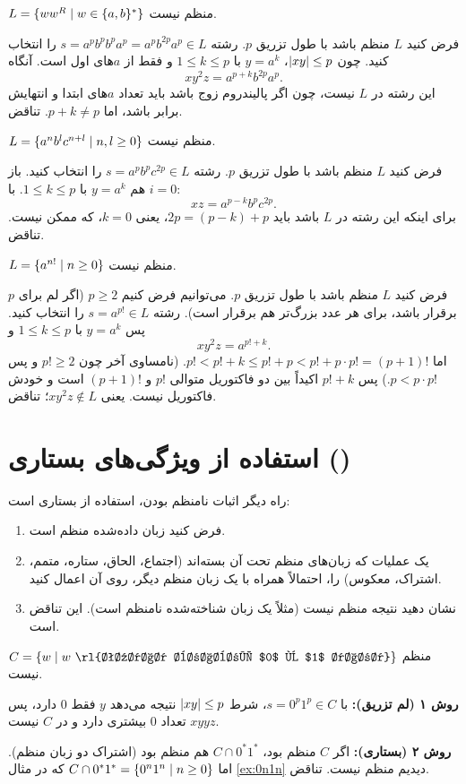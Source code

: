 \begin{example}
$L=\{ww^R\mid w\in\{a,b\}^*\}$ منظم نیست.

فرض کنید $L$ منظم باشد با طول تزریق $p$. رشته $s=a^pb^pb^pa^p=a^pb^{2p}a^p\in L$ را انتخاب کنید. چون $\lvert xy\rvert\le p$، $y=a^k$ با $1\le k\le p$ و فقط از $a$های اول است. آنگاه
\[xy^2z=a^{p+k}b^{2p}a^p.\]
این رشته در $L$ نیست، چون اگر پالیندروم زوج باشد باید تعداد $a$های ابتدا و انتهایش برابر باشد، اما $p+k\neq p$. تناقض.
\end{example}

\begin{example}
$L=\{a^nb^lc^{n+l}\mid n,l\ge0\}$ منظم نیست.

فرض کنید $L$ منظم باشد با طول تزریق $p$. رشته $s=a^pb^pc^{2p}\in L$ را انتخاب کنید. باز هم $y=a^k$ با $1\le k\le p$. با $i=0$:
\[xz=a^{p-k}b^pc^{2p}.\]
برای اینکه این رشته در $L$ باشد باید $2p=(p-k)+p$، یعنی $k=0$، که ممکن نیست. تناقض.
\end{example}

\begin{example}[فاکتوریل]
$L=\{a^{n!}\mid n\ge0\}$ منظم نیست.

فرض کنید $L$ منظم باشد با طول تزریق $p$. می‌توانیم فرض کنیم $p\ge2$ (اگر لم برای $p$ برقرار باشد، برای هر عدد بزرگ‌تر هم برقرار است). رشته $s=a^{p!}\in L$ را انتخاب کنید. پس $y=a^k$ با $1\le k\le p$ و
\[xy^2z=a^{p!+k}.\]
اما $p!<p!+k\le p!+p<p!+p\cdot p!=(p+1)!$. (نامساوی آخر چون $p!\ge2$ و پس $p<p\cdot p!$.) پس $p!+k$ اکیداً بین دو فاکتوریل متوالی $p!$ و $(p+1)!$ است و خودش فاکتوریل نیست. یعنی $xy^2z\notin L$؛ تناقض.
\end{example}

\section{استفاده از ویژگی‌های بستاری ()}

راه دیگر اثبات نامنظم بودن، استفاده از بستاری است:
\begin{enumerate}
\item فرض کنید زبان داده‌شده منظم است.
\item یک عملیات که زبان‌های منظم تحت آن بسته‌اند (اجتماع، الحاق، ستاره، متمم، اشتراک، معکوس) را، احتمالاً همراه با یک زبان منظم دیگر، روی آن اعمال کنید.
\item نشان دهید نتیجه منظم نیست (مثلاً یک زبان شناخته‌شده نامنظم است). این تناقض است.
\end{enumerate}

\begin{example}
$C=\{w\st w\ \text{\rl{تعداد برابری $0$ و $1$ دارد}}\}$ منظم نیست.

\textbf{روش ۱ (لم تزریق):} با $s=0^p1^p\in C$، شرط $\lvert xy\rvert\le p$ نتیجه می‌دهد $y$ فقط $0$ دارد، پس $xyyz$ تعداد $0$ بیشتری دارد و در $C$ نیست.

\textbf{روش ۲ (بستاری):} اگر $C$ منظم بود، $C\cap0^*1^*$ هم منظم بود (اشتراک دو زبان منظم). اما $C\cap0^*1^*=\{0^n1^n\mid n\ge0\}$ که در مثال \ref{ex:0n1n} دیدیم منظم نیست. تناقض.
\end{example}

